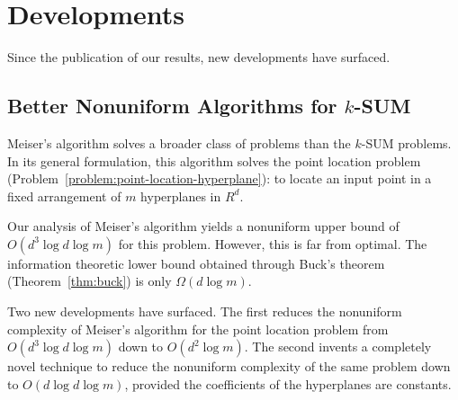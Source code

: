 \chapter{\done Developments}%
\label{chapter:developments}

Since the publication of our results, new developments have surfaced.

\section{Better Nonuniform Algorithms for \(k\)-SUM}%
\label{sec:developments:ksum-algorithm}

Meiser's algorithm solves a broader class of problems than the \(k\)-SUM
problems. In its general formulation, this algorithm solves
the point location problem (Problem~\ref{problem:point-location-hyperplane}):
to locate an input point in a fixed arrangement of $m$ hyperplanes in $R^d$.

Our analysis of Meiser's algorithm yields a nonuniform upper bound of \(O(d^3 \log
d \log m)\) for this problem. However, this is far from optimal.
The information theoretic lower bound obtained through
Buck's theorem (Theorem~\ref{thm:buck}) is only \(\Omega(d \log m)\).






Two new developments have surfaced.
%
The first reduces the nonuniform complexity of Meiser's algorithm for the point
location problem from
\(O(d^3 \log d \log m)\) down to \(O(d^2 \log m)\).
%
The second invents a completely novel technique to reduce the nonuniform
complexity of the same problem down to \(O(d \log d \log m)\), provided the
coefficients of the hyperplanes are constants.

